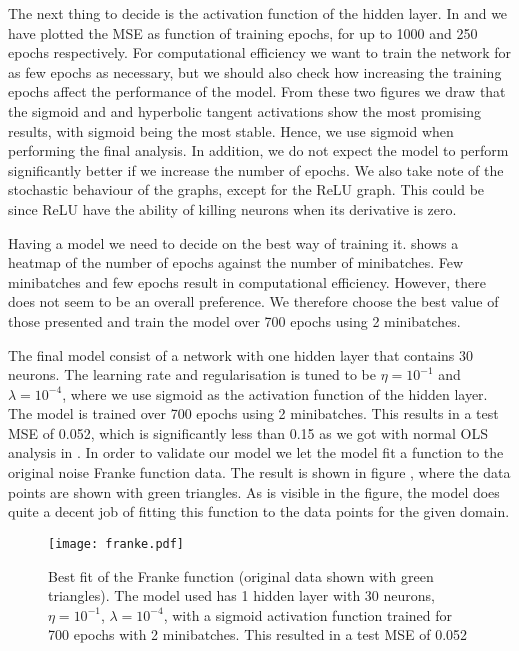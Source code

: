     The next thing to decide is the activation function of the hidden layer. In  and  we have plotted the MSE as function of training epochs, for up to 1000 and 250 epochs respectively. For computational efficiency we want to train the network for as few epochs as necessary, but we should also check how increasing the training epochs affect the performance of the model. From these two figures we draw that the sigmoid and and hyperbolic tangent activations show the most promising results, with sigmoid being the most stable. Hence, we use sigmoid when performing the final analysis. In addition, we do not expect the model to perform significantly better if we increase the number of epochs. We also take note of the stochastic behaviour of the graphs, except for the ReLU graph. This could be since ReLU have the ability of killing neurons when its derivative is zero. 

    Having a model we need to decide on the best way of training it.  shows a heatmap of the number of epochs against the number of minibatches. Few minibatches and few epochs result in computational efficiency. However, there does not seem to be an overall preference. We therefore choose the best value of those presented and train the model over 700 epochs using 2 minibatches. 

    The final model consist of a network with one hidden layer that contains 30 neurons. The learning rate and regularisation is tuned to be $\eta=10^{-1}$ and $\lambda=10^{-4}$, where we use sigmoid as the activation function of the hidden layer. The model is trained over 700 epochs using 2 minibatches. This results in a test MSE of 0.052, which is significantly less than 0.15 as we got with normal OLS analysis in \projectOne. In order to validate our model we let the model fit a function to the original noise Franke function data. The result is shown in figure , where the data points are shown with green triangles. As is visible in the figure, the model does quite a decent job of fitting this function to the data points for the given domain. 

    \begin{figure}[h!]
        \texttt{[image: franke.pdf]}
        \caption{Best fit of the Franke function (original data shown with green triangles). The model used has 1 hidden layer with 30 neurons, $\eta=10^{-1}$, $\lambda=10^{-4}$, with a sigmoid activation function trained for 700 epochs with 2 minibatches. This resulted in a test MSE of 0.052}
        \label{fig:franke}
    \end{figure}

